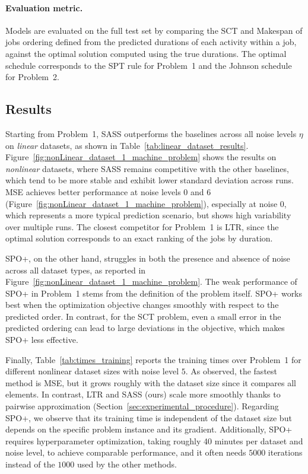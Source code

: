 \documentclass{article}
\begin{document}
\paragraph{Evaluation metric.}
Models are evaluated on the full test set by comparing the SCT and Makespan of jobs ordering defined from the predicted durations of each activity within a job, against the optimal solution computed using the true durations. The optimal schedule corresponds to the SPT rule for Problem~1 and the Johnson schedule for Problem~2.


\subsection{Results}

Starting from Problem~1, SASS outperforms the baselines across all noise levels $\eta$ on \emph{linear} datasets, as shown in Table~\ref{tab:linear_dataset_results}.
Figure~\ref{fig:nonLinear_dataset_1_machine_problem} shows the results on \emph{nonlinear} datasets, where SASS remains competitive with the other baselines, which tend to be more stable and exhibit lower standard deviation across runs. MSE achieves better performance at noise levels $0$ and $6$ (Figure~\ref{fig:nonLinear_dataset_1_machine_problem}), especially at noise $0$, which represents a more typical prediction scenario, but shows high variability over multiple runs. The closest competitor for Problem~1 is LTR, since the optimal solution corresponds to an exact ranking of the jobs by duration.

SPO+, on the other hand, struggles in both the presence and absence of noise across all dataset types, as reported in Figure~\ref{fig:nonLinear_dataset_1_machine_problem}. The weak performance of SPO+ in Problem~1 stems from the definition of the problem itself. SPO+ works best when the optimization objective changes smoothly with respect to the predicted order. In contrast, for the SCT problem, even a small error in the predicted ordering can lead to large deviations in the objective, which makes SPO+ less effective.

Finally, Table~\ref{tab:times_training} reports the training times over Problem~1 for different nonlinear dataset sizes with noise level $5$. As observed, the fastest method is MSE, but it grows roughly with the dataset size since it compares all elements. In contrast, LTR and SASS (ours) scale more smoothly thanks to pairwise approximation (Section~\ref{sec:experimental_procedure}).
Regarding SPO+, we observe that its training time is independent of the dataset size but depends on the specific problem instance and its gradient. Additionally, SPO+ requires hyperparameter optimization, taking roughly 40 minutes per dataset and noise level, to achieve comparable performance, and it often needs $5000$ iterations instead of the $1000$ used by the other methods.
\end{document}
